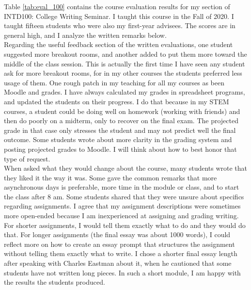 \documentclass[../../../main.tex]{subfiles}
\begin{document}
Table \ref{tab:eval_100} contains the course evaluation results for my section of INTD100: College Writing Seminar.  I taught this course in the Fall of 2020.  I taught fifteen students who were also my first-year advisees.  The scores are in general high, and I analyze the written remarks below.
\\
\vspace{0.25cm}
Regarding the useful feedback section of the written evaluations, one student suggested more breakout rooms, and another added to put them more toward the middle of the class session.  This is actually the first time I have seen any student ask for more breakout rooms, for in my other courses the students preferred less usage of them.  One rough patch in my teaching for all my courses as been Moodle and grades.  I have always calculated my grades in spreadsheet programs, and updated the students on their progress.  I do that because in my STEM courses, a student could be doing well on homework (working with friends) and then do poorly on a midterm, only to recover on the final exam.  The projected grade in that case only stresses the student and may not predict well the final outcome.  Some students wrote about more clarity in the grading system and posting projected grades to Moodle.  I will think about how to best honor that type of request.
\\
\vspace{0.25cm}
When asked what they would change about the course, many students wrote that they liked it the way it was.  Some gave the common remarks that more asynchronous days is preferable, more time in the module or class, and to start the class after 8 am.  Some students shared that they were unsure about specifics regarding assignments.  I agree that my assignment descriptions were sometimes more open-ended because I am inexperienced at assigning and grading writing.  For shorter assignments, I would tell them exactly what to do and they would do that.  For longer assignments (the final essay was about 1000 words), I could reflect more on how to create an essay prompt that structures the assignment without telling them exactly what to write.  I chose a shorter final essay length after speaking with Charles Eastman about it, when he cautioned that some students have not written long pieces.  In such a short module, I am happy with the results the students produced.
\end{document}
